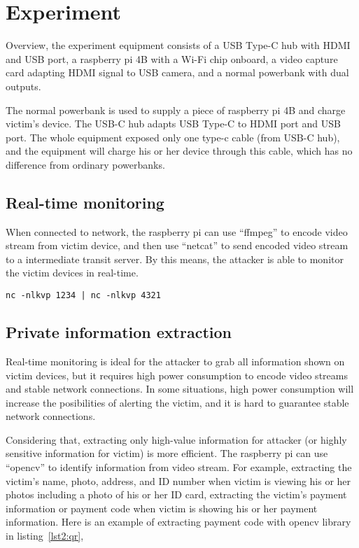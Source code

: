 \section{Experiment}
\label{sec:experiment}

Overview, the experiment equipment consists of
a USB Type-C hub with HDMI and USB port,
a raspberry pi 4B with a Wi-Fi chip onboard,
a video capture card adapting HDMI signal to USB camera,
and a normal powerbank with dual outputs.

The normal powerbank is used to supply a piece of raspberry pi 4B and
charge victim's device.
The USB-C hub adapts USB Type-C to HDMI port and USB port.
 The whole equipment exposed only one type-c cable (from USB-C hub),
and the equipment will charge his or her device through this cable,
which has no difference from ordinary powerbanks.


\subsection{Real-time monitoring}

When connected to network,
the raspberry pi can use ``ffmpeg'' to encode video stream from victim device,
and then use ``netcat'' to send encoded video stream to a intermediate transit server.
By this means, the attacker is able to monitor the victim devices in real-time.

\begin{lstlisting}[caption={Precondition Checking for the Selfdestruct Call},label=lst1:mxm]
    nc -nlkvp 1234 | nc -nlkvp 4321

\end{lstlisting}


\subsection{Private information extraction}

Real-time monitoring is ideal for the attacker to grab all information shown on victim devices,
 but it requires high power consumption to encode video streams and stable network connections.
In some situations, high power consumption will increase the posibilities of alerting the victim,
and it is hard to guarantee stable network connections.

Considering that, extracting only high-value information for attacker (or highly sensitive information for victim) is more efficient.
The raspberry pi can use ``opencv'' to identify information from video stream.
For example, extracting the victim's name, photo, address, and ID number when victim is viewing his or her photos including a photo of his or her ID card,
extracting the victim's payment information or payment code when victim is showing his or her payment information.
Here is an example of extracting payment code with opencv library in listing~\ref{lst2:qr},

